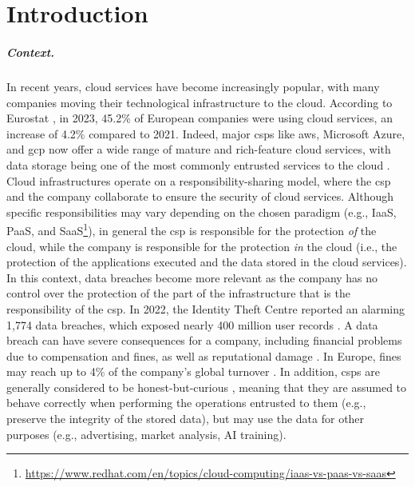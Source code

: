 \chapter{Introduction}
\label{sec:introduction}

\paragraph{Context.} In recent years, cloud services have become increasingly popular, with many companies moving their technological infrastructure to the cloud. According to Eurostat \cite{eurostat_cloud}, in 2023, 45.2\% of European companies were using cloud services, an increase of 4.2\% compared to 2021. Indeed, major \glspl{csp} like \gls{aws}, Microsoft Azure, and \gls{gcp} now offer a wide range of mature and rich-feature cloud services, with data storage being one of the most commonly entrusted services to the cloud \cite{eurostat_cloud}.
Cloud infrastructures operate on a responsibility-sharing model, where the \gls{csp} and the company collaborate to ensure the security of cloud services. Although specific responsibilities may vary depending on the chosen paradigm (e.g., IaaS, PaaS, and SaaS\footnote{\url{https://www.redhat.com/en/topics/cloud-computing/iaas-vs-paas-vs-saas}}), in general the \gls{csp} is responsible for the protection \textit{of} the cloud, while the company is responsible for the protection \textit{in} the cloud (i.e., the protection of the applications executed and the data stored in the cloud services).
In this context, data breaches become more relevant as the company has no control over the protection of the part of the infrastructure that is the responsibility of the \gls{csp}. In 2022, the Identity Theft Centre reported an alarming 1,774 data breaches, which exposed nearly 400 million user records \cite{itc_2022_databreach}. A data breach can have severe consequences for a company, including financial problems due to compensation and fines, as well as reputational damage \citep{breach_pentagon,breach_verizon,breach_voter}. In Europe, fines may reach up to 4\% of the company's global turnover \cite{eu-gdpr}. 
In addition, \glspl{csp} are generally considered to be honest-but-curious \cite{cac}, meaning that they are assumed to behave correctly when performing the operations entrusted to them (e.g., preserve the integrity of the stored data), but may use the data for other purposes (e.g., advertising, market analysis, AI training). 

